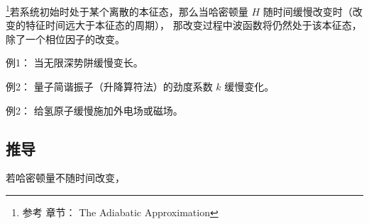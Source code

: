 

\begin{issues}
\issueDraft
\end{issues}

\footnote{参考 \cite{GriffE} 章节： The Adiabatic Approximation}若系统初始时处于某个离散的本征态，那么当哈密顿量 $H$ 随时间缓慢改变时（改变的特征时间远大于本征态的周期）， 那改变过程中波函数将仍然处于该本征态，除了一个相位因子的改变。

例1： 当无限深势阱缓慢变长。

例2： 量子简谐振子（升降算符法）的劲度系数 $k$ 缓慢变化。

例2： 给氢原子缓慢施加外电场或磁场。

\subsection{推导}
若哈密顿量不随时间改变，
\be
